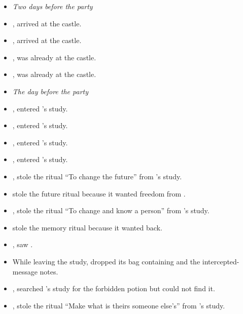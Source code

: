 \begin{itemize}
  \item[] \textit{Two days before the party}

  \item {},  arrived at the castle.
  \item {},  arrived at the castle.
  \item {},  was already at the castle.
  \item {},  was already at the castle.

  \item[] \textit{The day before the party}

  \item {},  entered 's study.
  \item {},  entered 's study.
  \item {},  entered 's study.
  \item {},  entered 's study.
  \item {},  stole the ritual ``To change the future'' from 's study.
  \item {} stole the future ritual because it wanted freedom from .
  \item {},  stole the ritual ``To change and know a person'' from 's study.
  \item {} stole the memory ritual because it wanted  back.
  \item {},  saw .
  \item While leaving the study,  dropped its bag containing  and the intercepted-message notes.
  \item {},  searched 's study for the forbidden potion but could not find it.
  \item {},  stole the ritual ``Make what is theirs someone else's'' from 's study.

\end{itemize}
